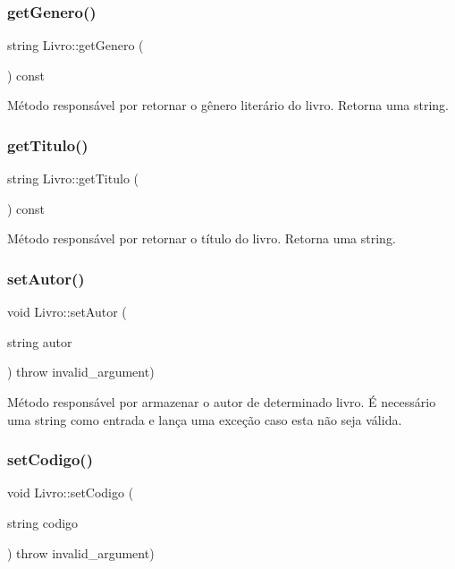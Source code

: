 \subsubsection{\texorpdfstring{get\+Genero()}{getGenero()}}
{\footnotesize\ttfamily string Livro\+::get\+Genero (\begin{DoxyParamCaption}{ }\end{DoxyParamCaption}) const\hspace{0.3cm}{\ttfamily [inline]}}

Método responsável por retornar o gênero literário do livro. Retorna uma string. \mbox{\label{classLivro_a4b4e2e74d4fa1a0e6e9a4d6c05dc3bd4}} 
\subsubsection{\texorpdfstring{get\+Titulo()}{getTitulo()}}
{\footnotesize\ttfamily string Livro\+::get\+Titulo (\begin{DoxyParamCaption}{ }\end{DoxyParamCaption}) const\hspace{0.3cm}{\ttfamily [inline]}}

Método responsável por retornar o título do livro. Retorna uma string. \mbox{\label{classLivro_adcc86bd3488de769173fe872c7949077}} 
\subsubsection{\texorpdfstring{set\+Autor()}{setAutor()}}
{\footnotesize\ttfamily void Livro\+::set\+Autor (\begin{DoxyParamCaption}\item[{string}]{autor }\end{DoxyParamCaption}) throw  invalid\+\_\+argument) }

Método responsável por armazenar o autor de determinado livro. É necessário uma string como entrada e lança uma exceção caso esta não seja válida. \mbox{\label{classLivro_a30b6c41de98f92185b4a5f33dcdf5a66}} 
\subsubsection{\texorpdfstring{set\+Codigo()}{setCodigo()}}
{\footnotesize\ttfamily void Livro\+::set\+Codigo (\begin{DoxyParamCaption}\item[{string}]{codigo }\end{DoxyParamCaption}) throw  invalid\+\_\+argument) }

